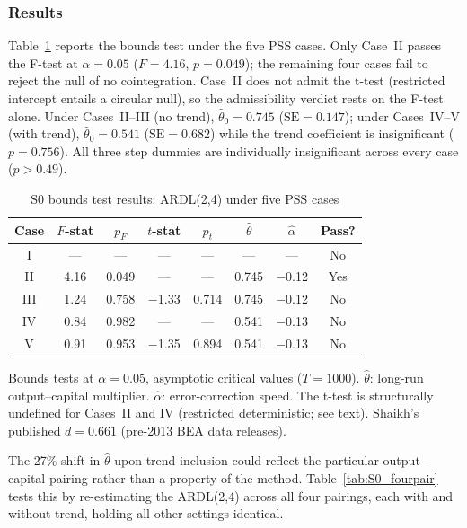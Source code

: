 \documentclass[11pt,a4paper]{article}
\begin{document}

\subsubsection{Results}
\label{subsec:S0_results}

Table~\ref{tab:S0_bounds} reports the bounds test under the five PSS cases.
Only Case~II passes the F-test at $\alpha = 0.05$ ($F = 4.16$,
$p = 0.049$); the remaining four cases fail to reject the null of no
cointegration. Case~II does not admit the t-test (restricted intercept
entails a circular null), so the admissibility verdict rests on the F-test
alone. Under Cases~II--III (no trend), $\hat{\theta}_0 = 0.745$
($\text{SE} = 0.147$); under Cases~IV--V (with trend),
$\hat{\theta}_0 = 0.541$ ($\text{SE} = 0.682$) while the trend coefficient
is insignificant ($p = 0.756$). All three step dummies are individually
insignificant across every case ($p > 0.49$).

\begin{table}[!ht]
	\centering
	\small
	\caption{S0 bounds test results: ARDL(2,4) under five PSS cases}
	\label{tab:S0_bounds}
	\begin{tabular}{cccccccc}
		\hline\hline
		Case & $F$-stat & $p_F$ & $t$-stat & $p_t$
		     & $\hat{\theta}$ & $\hat{\alpha}$ & Pass? \\
		\hline
		I    & ---   & ---   & ---    & ---   & ---   & ---     & No  \\
		II   & 4.16  & 0.049 & ---    & ---   & 0.745 & $-$0.12 & Yes \\
		III  & 1.24  & 0.758 & $-$1.33 & 0.714 & 0.745 & $-$0.12 & No  \\
		IV   & 0.84  & 0.982 & ---    & ---   & 0.541 & $-$0.13 & No  \\
		V    & 0.91  & 0.953 & $-$1.35 & 0.894 & 0.541 & $-$0.13 & No  \\
		\hline
	\end{tabular}
	\par\vspace{0.3em}
	\footnotesize
	Bounds tests at $\alpha = 0.05$, asymptotic critical values ($T = 1000$).
	$\hat{\theta}$: long-run output--capital multiplier.
	$\hat{\alpha}$: error-correction speed.
	The t-test is structurally undefined for Cases~II and IV
	(restricted deterministic; see text).
	Shaikh's published $d = 0.661$ (pre-2013 BEA data releases).
\end{table}

The 27\% shift in $\hat{\theta}$ upon trend inclusion could reflect the
particular output--capital pairing rather than a property of the method.
Table~\ref{tab:S0_fourpair} tests this by re-estimating the ARDL(2,4)
across all four pairings, each with and without trend, holding all other
settings identical.
\end{document}
